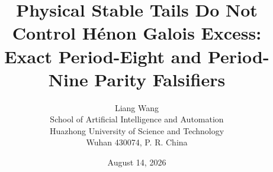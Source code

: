 \documentclass[11pt]{article}
\title{Physical Stable Tails Do Not Control H\'enon Galois Excess:\\
Exact Period-Eight and Period-Nine Parity Falsifiers}
\author{Liang Wang\\
\small School of Artificial Intelligence and Automation\\[-1mm]
\small Huazhong University of Science and Technology\\[-1mm]
\small Wuhan 430074, P. R. China}
\date{August 14, 2026}
\theoremstyle{remark}
\begin{document}
\maketitle











\renewcommand{\bibfont}{\small}



\appendix

\end{document}
